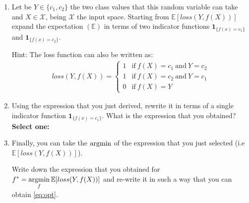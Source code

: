 \begin{enumerate}
    \item {} Let be $Y\in\{c_1,c_2\}$ the two class values that this random variable can take and $X \in \mathcal{X}$, being $\mathcal{X}$ the input space. Starting from $\mathbb{E}[loss(Y,f(X))]$ expand the expectation $(\mathbb{E})$ in terms of two indicator functions  $\mathbf{1}_{\{f(x)=c_1\}}$ and $\mathbf{1}_{\{f(x)=c_2\}}$.
    
    Hint: The loss function can also be written as:
    \begin{gather*}
    loss(Y,f(X)) = 
    \begin{cases} 
      1 & \text{if}~f(X)=c_1 ~\text{and}~ Y=c_2 \\
      1 & \text{if}~f(X)=c_2 ~\text{and}~ Y=c_1 \\      
      0 & \text{if}~f(X)=Y   
    \end{cases}        
    \end{gather*}    
    
    \begin{tcolorbox}[fit,height=5cm, width=0.9\textwidth, blank,     borderline={1pt}{-2pt},nobeforeafter]
    \end{tcolorbox}
    
    
\pagebreak
    
    \item {} Using the expression that you just derived, rewrite it in terms of a single indicator function $\mathbf{1}_{\{f(x)=c_1\}}$. What is the expression that you obtained?
    \textbf{Select one:}


    \item {} Finally, you can take the $\mathop{\mathrm{argmin}}$ of the expression that you just selected (i.e $\mathbb{E}[loss(Y,f(X))]$). 
    
    Write down the expression that you obtained for  $\displaystyle{f^* =\mathop{\mathrm{argmin}}_{f}\mathbb{E}[loss(Y,f(X))]}$ and re-write it in such a way that you can obtain \eqref{eq:opt}.
    
    \begin{tcolorbox}[fit,height=10cm, width=0.9\textwidth, blank,     borderline={1pt}{-2pt},nobeforeafter]
    \end{tcolorbox}    
    
\end{enumerate}

